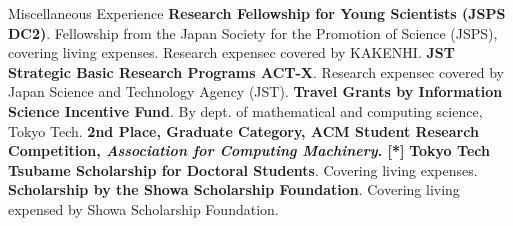\begin{rubric}{Miscellaneous Experience}
  \entry*[2021] \textbf{Research Fellowship for Young Scientists (JSPS DC2)}.
  Fellowship from the Japan Society for the Promotion of Science (JSPS), covering
  living expenses. Research expensec covered by KAKENHI.
  \entry*[2020] \textbf{JST Strategic Basic Research Programs ACT-X}. Research
  expensec covered by Japan Science and Technology Agency (JST).
  \entry*[2019] \textbf{Travel Grants by Information Science Incentive Fund}. By
  dept. of mathematical and computing science, Tokyo Tech.
  \entry*[2019] \textbf{2nd Place, Graduate Category, ACM Student Research
    Competition, \textit{Association for Computing Machinery}. [*]}
  \entry*[2020] \textbf{Tokyo Tech Tsubame Scholarship for Doctoral
    Students}. Covering living expenses.
  \entry*[2014] \textbf{Scholarship by the Showa Scholarship Foundation}. Covering
  living expensed by Showa Scholarship Foundation.
\end{rubric}